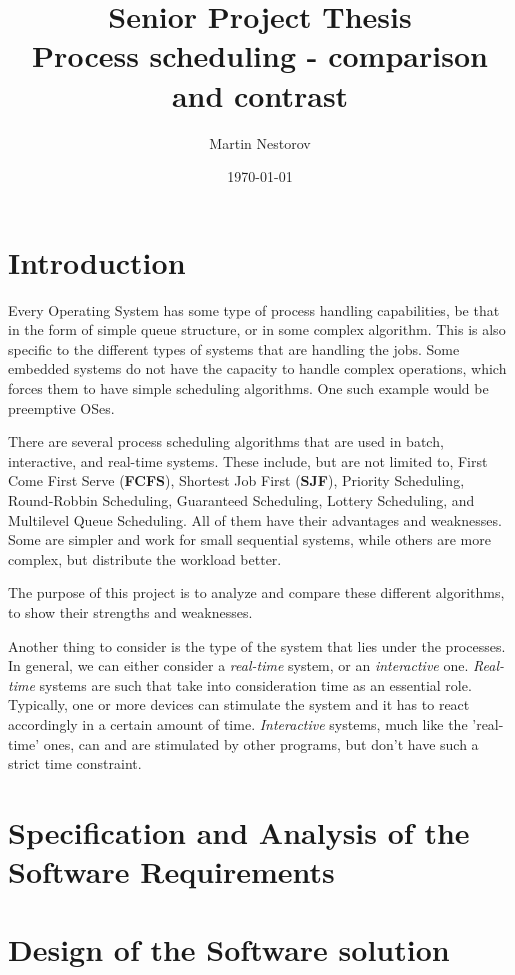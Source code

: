 \documentclass{article}
\title{Senior Project Thesis\\
       \large Process scheduling - comparison and contrast}
\date{\today}
\author{Martin Nestorov}
\begin{document}
\maketitle
{}

\newpage

\section{Introduction}

Every Operating System has some type of process handling capabilities, be that in the form of simple queue structure, or in some complex algorithm. This is also specific to the different types of systems that are handling the jobs. Some embedded systems do not have the capacity to handle complex operations, which forces them to have simple scheduling algorithms. One such example would be preemptive OSes.

There are several process scheduling algorithms that are used in batch, interactive, and real-time systems. These include, but are not limited to, First Come First Serve (\textbf{FCFS}), Shortest Job First (\textbf{SJF}), Priority Scheduling, Round-Robbin Scheduling, Guaranteed Scheduling, Lottery Scheduling, and Multilevel Queue Scheduling. All of them have their advantages and weaknesses. Some are simpler and work for small sequential systems, while others are more complex, but distribute the workload better.

The purpose of this project is to analyze and compare these different algorithms, to show their strengths and weaknesses.

Another thing to consider is the type of the system that lies under the processes. In general, we can either consider a \textit{real-time} system, or an \textit{interactive} one. \textit{Real-time} systems are such that take into consideration time as an essential role. Typically, one or more devices can stimulate the system and it has to react accordingly in a certain amount of time. \textit{Interactive} systems, much like the 'real-time' ones, can and are stimulated by other programs, but don't have such a strict time constraint.

\section{Specification and Analysis of the Software Requirements}

\section{Design of the Software solution}
\end{document}

